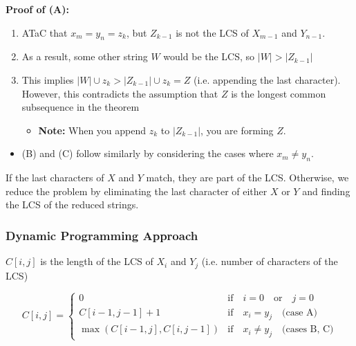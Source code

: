 \begin{derivation}
    \textbf{Proof of (A):}
    \begin{enumerate}
        \item ATaC that \(x_m = y_n = z_k\), but \(Z_{k-1}\) is not the LCS of \(X_{m-1}\) and \(Y_{n-1}\). 
        \item As a result, some other string \(W\) would be the LCS, so $|W|>|Z_{k-1}|$
        \item This implies \(|W| \cup z_k > |Z_{k-1}| \cup z_k = Z\) (i.e. appending the last character). However, this contradicts the assumption that \(Z\) is the longest common subsequence in the theorem
        \begin{itemize}
            \item \textbf{Note:} When you append $z_k$ to $|Z_{k-1}|$, you are forming $Z$.
        \end{itemize}
    \end{enumerate}
    \begin{itemize}
        \item (B) and (C) follow similarly by considering the cases where \(x_m \neq y_n\).
    \end{itemize}
\end{derivation}

\begin{intuition}
If the last characters of \(X\) and \(Y\) match, they are part of the LCS. Otherwise, we reduce the problem by eliminating the last character of either \(X\) or \(Y\) and finding the LCS of the reduced strings.
\end{intuition}

\subsubsection{Dynamic Programming Approach}
\begin{definition}
    \(C[i, j]\) is the length of the LCS of \(X_i\) and \(Y_j\) (i.e. number of characters of the LCS)

    \begin{equation}
    C[i, j] = 
    \begin{cases}
    0 & \text{if} \quad i = 0 \quad \text{or} \quad j = 0 \\
    C[i-1, j-1] + 1 & \text{if} \quad x_i = y_j \quad \text{(case A)} \\
    \max(C[i-1, j], C[i, j-1]) & \text{if} \quad x_i \neq y_j \quad \text{(cases B, C)}
    \end{cases}
    \end{equation}

\end{definition}

